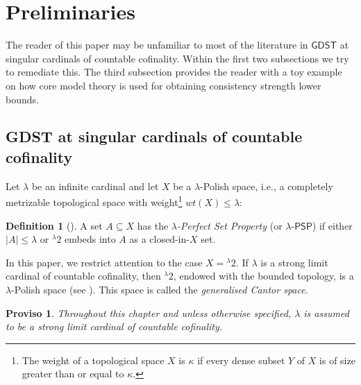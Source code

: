\documentclass{amsart}
\numberwithin{equation}{section}
\newtheorem*{proviso}{Proviso}
\theoremstyle{definition}
\newtheorem{definition}[theorem]{Definition}
\theoremstyle{remark}
\begin{document}
    

    \section{Preliminaries}\label{section:preliminaries}

    The reader of this paper may be unfamiliar to most of the literature in $\mathsf{GDST}$ at singular cardinals of countable cofinality. Within the first two subsections we try to remediate this. The third subsection provides the reader with a toy example on how core model theory is used for obtaining consistency strength lower bounds.

    \subsection{\textsf{GDST} at singular cardinals of countable cofinality} Let $\lambda$ be an infinite cardinal and let $X$ be a $\lambda$-Polish space, i.e., a completely metrizable topological space with weight\footnote{The weight of a topological space $X$ is $\kappa$ if every dense subset $Y$ of $X$ is of size greater than or equal to $\kappa$.} $wt(X)\leq\lambda$:

    \begin{definition}[{\cite[Definition 7.0.1]{DMR}}]
	       A set $A\subseteq X$ has the \emph{$\lambda$-Perfect
           Set Property} (or $\lambda$-$\mathsf{PSP}$) if either $|A|\leq\lambda$ or $^{\lambda}2$ embeds into $A$ as a closed-in-$X$ set.
    \end{definition}

    In this paper, we restrict attention to the case $X = {}^{\lambda}2$. If $\lambda$ is a strong limit cardinal of countable cofinality, then ${}^{\lambda}2$, endowed with the bounded topology, is a $\lambda$-Polish space (see \cite[Proposition~3.12 (g,h)]{AndrettaMottoRos}). This space is called the \emph{generalised Cantor space}.

    \begin{proviso}
	Throughout this chapter and unless otherwise specified, $\lambda$ is assumed to be a strong limit cardinal of countable cofinality.
    \end{proviso}
\end{document}
